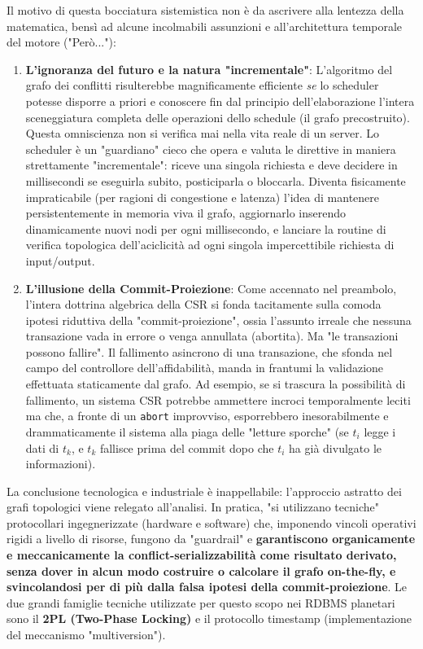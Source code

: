 Il motivo di questa bocciatura sistemistica non è da ascrivere alla lentezza della matematica, bensì ad alcune incolmabili assunzioni e all'architettura temporale del motore ("Però..."):
\begin{enumerate}
    \item \textbf{L'ignoranza del futuro e la natura "incrementale"}: L'algoritmo del grafo dei conflitti risulterebbe magnificamente efficiente \textit{se} lo scheduler potesse disporre a priori e conoscere fin dal principio dell'elaborazione l'intera sceneggiatura completa delle operazioni dello schedule (il grafo precostruito). Questa omniscienza non si verifica mai nella vita reale di un server. Lo scheduler è un "guardiano" cieco che opera e valuta le direttive in maniera strettamente "incrementale": riceve una singola richiesta e deve decidere in millisecondi se eseguirla subito, posticiparla o bloccarla. Diventa fisicamente impraticabile (per ragioni di congestione e latenza) l'idea di mantenere persistentemente in memoria viva il grafo, aggiornarlo inserendo dinamicamente nuovi nodi per ogni millisecondo, e lanciare la routine di verifica topologica dell'aciclicità ad ogni singola impercettibile richiesta di input/output.
    \item \textbf{L'illusione della Commit-Proiezione}: Come accennato nel preambolo, l'intera dottrina algebrica della CSR si fonda tacitamente sulla comoda ipotesi riduttiva della "commit-proiezione", ossia l'assunto irreale che nessuna transazione vada in errore o venga annullata (abortita). Ma "le transazioni possono fallire". Il fallimento asincrono di una transazione, che sfonda nel campo del controllore dell'affidabilità, manda in frantumi la validazione effettuata staticamente dal grafo. Ad esempio, se si trascura la possibilità di fallimento, un sistema CSR potrebbe ammettere incroci temporalmente leciti ma che, a fronte di un \texttt{abort} improvviso, esporrebbero inesorabilmente e drammaticamente il sistema alla piaga delle "letture sporche" (se $t_i$ legge i dati di $t_k$, e $t_k$ fallisce prima del commit dopo che $t_i$ ha già divulgato le informazioni).
\end{enumerate}

La conclusione tecnologica e industriale è inappellabile: l'approccio astratto dei grafi topologici viene relegato all'analisi. In pratica, "si utilizzano tecniche" protocollari ingegnerizzate (hardware e software) che, imponendo vincoli operativi rigidi a livello di risorse, fungono da "guardrail" e \textbf{garantiscono organicamente e meccanicamente la conflict-serializzabilità come risultato derivato, senza dover in alcun modo costruire o calcolare il grafo on-the-fly, e svincolandosi per di più dalla falsa ipotesi della commit-proiezione}. Le due grandi famiglie tecniche utilizzate per questo scopo nei RDBMS planetari sono il \textbf{2PL (Two-Phase Locking)} e il protocollo timestamp (implementazione del meccanismo "multiversion").

